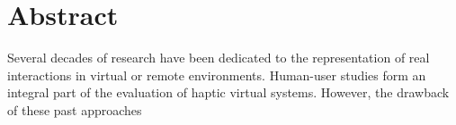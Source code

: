 
\thispagestyle{plain}

\section*{Abstract}


\switchlanguage{\lang} %
Several decades of research have been dedicated to the representation of real interactions in virtual or remote environments. Human-user studies form an integral part of the evaluation of haptic virtual systems. However, the drawback of  these  past approaches 